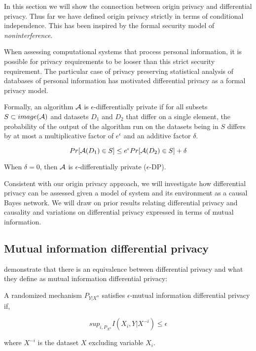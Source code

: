 \documentclass[../thesis.tex]{subfiles}
\begin{document}
In this section we will show the connection between
origin privacy and differential privacy.
Thus far we have defined origin privacy strictly in
terms of conditional independence.
This has been inspired by the formal security model
of \emph{noninterference}.

When assessing computational systems that process
personal information, it is possible for privacy
requirements to be looser than this strict security
requirement.
The particular case of privacy preserving statistical
analysis of databases of personal information has
motivated differential privacy as a formal privacy
model. \cite{dwork06icalp,dwork08jpc}

Formally, an algorithm $\mathcal{A}$ is $\epsilon$-differentially private
if for all subsets $S \subset image(\mathcal{A})$ and
datasets $D_1$ and $D_2$ that differ on a single element,
the probability of the output of the algorithm run
on the datasets being in $S$ differs by at most a
multiplicative factor of $e^\epsilon$ and an additive
factor $\delta$. \cite{dwork2014algorithmic}

\begin{dfn}
$$Pr[\mathcal{A}(D_1) \in S] \leq e^\epsilon Pr[\mathcal{A}(D_2) \in S] + \delta$$
\end{dfn}

When $\delta = 0$, then $\mathcal{A}$ is $\epsilon$-differentially
private ($\epsilon$-DP).

Consistent with our origin privacy approach, we will
investigate how differential privacy can be assessed
given a model of system and its environment as a
causal Bayes network.
We will draw on prior results relating differential
privacy and causality and variations on differential
privacy expressed in terms of mutual information.

\subsection{Mutual information differential privacy}

\cite{cuff2016differential} demonstrate that there is
an equivalence between differential privacy and what they define
as mutual information differential privacy:

\begin{dfn}
  A randomized mechanism $P_{Y \vert X^n}$ satisfies $\epsilon$-mutual
  information differential privacy if,

  $$sup_{i, P_{X^n}} I(X_i, Y \vert X^{-i}) \leq \epsilon$$

  where $X^{-i}$ is the dataset $X$ excluding variable
  $X_i$.
\end{dfn}
\end{document}
